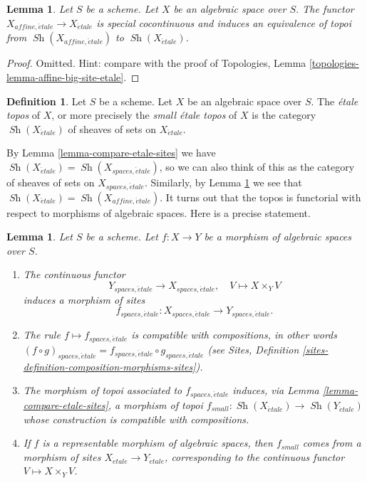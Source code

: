 \documentclass{stacks-project}
\theoremstyle{plain}
\newtheorem{lemma}[subsection]{Lemma}
\theoremstyle{definition}
\newtheorem{definition}[subsection]{Definition}
\theoremstyle{remark}
\numberwithin{equation}{subsection}
\def\Sh{\mathop{\mathit{Sh}}\nolimits}
\def\etale{{\acute{e}tale}}
\begin{document}
\begin{lemma}
\label{lemma-alternative}
Let $S$ be a scheme. Let $X$ be an algebraic space over $S$.
The functor $X_{affine, \etale} \to X_\etale$
is special cocontinuous and induces an equivalence of topoi from
$\Sh(X_{affine, \etale})$ to $\Sh(X_\etale)$.
\end{lemma}

\begin{proof}
Omitted. Hint: compare with the proof of
Topologies, Lemma \ref{topologies-lemma-affine-big-site-etale}.
\end{proof}

\begin{definition}
\label{definition-etale-topos}
Let $S$ be a scheme. Let $X$ be an algebraic space over $S$.
The {\it \'etale topos} of $X$, or more precisely the
{\it small \'etale topos} of $X$ is the category
$\Sh(X_\etale)$
of sheaves of sets on $X_\etale$.
\end{definition}

\noindent
By
Lemma \ref{lemma-compare-etale-sites}
we have
$\Sh(X_\etale) = \Sh(X_{spaces, \etale})$,
so we can also think of this as the category of sheaves of sets on
$X_{spaces, \etale}$. Similarly, by
Lemma \ref{lemma-alternative}
we see that
$\Sh(X_\etale) = \Sh(X_{affine, \etale})$.
It turns out that the topos is functorial with respect to morphisms
of algebraic spaces. Here is a precise statement.

\begin{lemma}
\label{lemma-functoriality-etale-site}
Let $S$ be a scheme.
Let $f : X \to Y$ be a morphism of algebraic spaces over $S$.
\begin{enumerate}
\item The continuous functor
$$
Y_{spaces, \etale} \longrightarrow X_{spaces, \etale}, \quad
V \longmapsto X \times_Y V
$$
induces a morphism of sites
$$
f_{spaces, \etale} :
X_{spaces, \etale}
\to
Y_{spaces, \etale}.
$$
\item The rule $f \mapsto f_{spaces, \etale}$ is compatible with
compositions, in other words $(f \circ g)_{spaces, \etale}
= f_{spaces, \etale} \circ g_{spaces, \etale}$ (see
Sites, Definition \ref{sites-definition-composition-morphisms-sites}).
\item The morphism of topoi associated to $f_{spaces, \etale}$
induces, via Lemma \ref{lemma-compare-etale-sites}, a morphism of topoi
$f_{small} : \Sh(X_\etale) \to \Sh(Y_\etale)$
whose construction is compatible with compositions.
\item If $f$ is a representable morphism of algebraic spaces,
then $f_{small}$ comes from a morphism of sites
$X_\etale \to Y_\etale$,
corresponding to the continuous functor $V \mapsto X \times_Y V$.
\end{enumerate}
\end{lemma}
\end{document}

